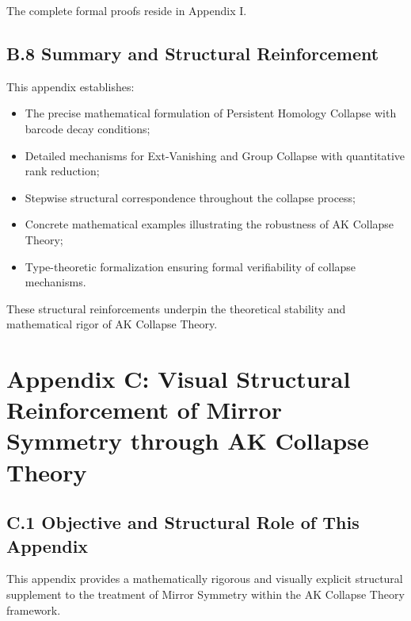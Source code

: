 \documentclass[11pt]{article}
\begin{document}
The complete formal proofs reside in Appendix I.

\subsection*{B.8 Summary and Structural Reinforcement}

This appendix establishes:

\begin{itemize}
    \item The precise mathematical formulation of Persistent Homology Collapse with barcode decay conditions;
    \item Detailed mechanisms for Ext-Vanishing and Group Collapse with quantitative rank reduction;
    \item Stepwise structural correspondence throughout the collapse process;
    \item Concrete mathematical examples illustrating the robustness of AK Collapse Theory;
    \item Type-theoretic formalization ensuring formal verifiability of collapse mechanisms.
\end{itemize}

These structural reinforcements underpin the theoretical stability and mathematical rigor of AK Collapse Theory.

\FloatBarrier




\section*{Appendix C: Visual Structural Reinforcement of Mirror Symmetry through AK Collapse Theory}

\subsection*{C.1 Objective and Structural Role of This Appendix}

This appendix provides a mathematically rigorous and visually explicit structural supplement to the treatment of Mirror Symmetry within the AK Collapse Theory framework.
\end{document}
